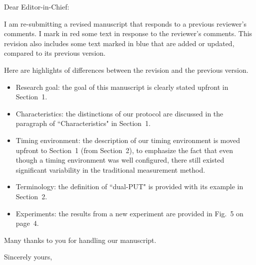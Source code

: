 \documentclass{letter} %
\begin{document}
\begin{letter}
\vspace{0.5in}
 
\opening{Dear Editor-in-Chief:} 
 
\noindent 

I am re-submitting a revised manuscript that responds to a previous reviewer's comments. 
I mark in red some text in response to the reviewer's comments. 
This revision also includes some text marked in blue that are added or updated, 
compared to its previous version.

Here are highlights of differences between the revision and the previous version.

\begin{itemize}

\item Research goal: the goal of this manuscript is clearly stated upfront in Section~1. 

\item Characteristics: the distinctions of our protocol are discussed 
in the paragraph of ``Characteristics" in Section~1. 

\item Timing environment: the description of our timing environment 
is moved upfront to Section~1 (from Section~2), 
to emphasize the fact that even though a timing environment was well configured, 
there still existed significant variability in the traditional measurement method.

\item Terminology: the definition of ``dual-PUT" is provided with its example in Section~2. 

\item Experiments: the results from a new experiment are provided in Fig.~5 on page~4.

\end{itemize} 

Many thanks to you for handling our manuscript.

\closing{Sincerely yours,} 

\end{letter}
 
\end{document}
